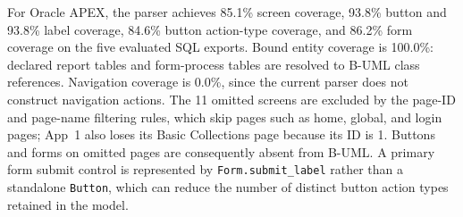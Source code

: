 For Oracle APEX, the parser achieves 85.1\% screen coverage, 93.8\% button and 93.8\% label coverage, 84.6\% button action-type coverage, and 86.2\% form coverage on the five evaluated SQL exports. Bound entity coverage is 100.0\%: declared report tables and form-process tables are resolved to B-UML class references. Navigation coverage is 0.0\%, since the current parser does not construct navigation actions. The 11 omitted screens are excluded by the page-ID and page-name filtering rules, which skip pages such as home, global, and login pages; App~1 also loses its Basic Collections page because its ID is 1. Buttons and forms on omitted pages are consequently absent from B-UML. A primary form submit control is represented by \texttt{Form.submit\_label} rather than a standalone \texttt{Button}, which can reduce the number of distinct button action types retained in the model.
